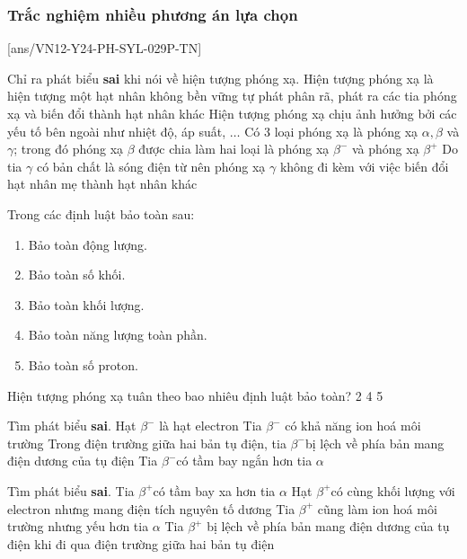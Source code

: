 \subsubsection{Trắc nghiệm nhiều phương án lựa chọn}
\setcounter{ex}{0}
[ans/VN12-Y24-PH-SYL-029P-TN]
\begin{ex}
	Chỉ ra phát biểu \textbf{sai} khi nói về hiện tượng phóng xạ.
	\choice
	{Hiện tượng phóng xạ là hiện tượng một hạt nhân không bền vững tự phát phân rã, phát ra các tia phóng xạ và biến đổi thành hạt nhân khác}
	{\True Hiện tượng phóng xạ chịu ảnh hưởng bởi các yếu tố bên ngoài như nhiệt độ, áp suất, $\dots$}
	{Có 3 loại phóng xạ là phóng xạ $\alpha, \beta$ và $\gamma$; trong đó phóng xạ $\beta$ được chia làm hai loại là phóng xạ $\beta^-$ và phóng xạ $\beta^{+}$}
	{Do tia $\gamma$ có bản chất là sóng điện từ nên phóng xạ $\gamma$ không đi kèm với việc biến đổi hạt nhân mẹ thành hạt nhân khác}
	\loigiai{
		
	}
\end{ex}
\begin{ex}
	Trong các định luật bảo toàn sau:
	\begin{enumerate}[label=(\arabic*)]
		\item Bảo toàn động lượng.
		\item Bảo toàn số khối.
		\item Bảo toàn khối lượng.
		\item Bảo toàn năng lượng toàn phần.
		\item Bảo toàn số proton.
	\end{enumerate}
	Hiện tượng phóng xạ tuân theo bao nhiêu định luật bảo toàn?
	\choice
	{2}
	{}
	{4}
	{5}
\end{ex}
\begin{ex}
	Tìm phát biểu \textbf{sai}.
	\choice
	{Hạt $\beta^{-}$ là hạt electron}
	{Tia $\beta^{-}$ có khả năng ion hoá môi trường}
	{Trong điện trường giữa hai bản tụ điện, tia $\beta^{-}$bị lệch về phía bản mang điện dương của tụ điện}
	{\True Tia $\beta^{-}$có tầm bay ngắn hơn tia $\alpha$}
	\loigiai{}
\end{ex}
\begin{ex}
	Tìm phát biểu \textbf{sai}.
	\choice
	{Tia $\beta^{+}$có tầm bay xa hơn tia $\alpha$}
	{Hạt $\beta^{+}$có cùng khối lượng với electron nhưng mang điện tích nguyên tố dương}
	{Tia $\beta^{+}$ cũng làm ion hoá môi trường nhưng yếu hơn tia $\alpha$}
	{\True Tia $\beta^{+}$ bị lệch về phía bản mang điện dương của tụ điện khi đi qua điện trường giữa hai bản tụ điện}
	\loigiai{}
\end{ex}
